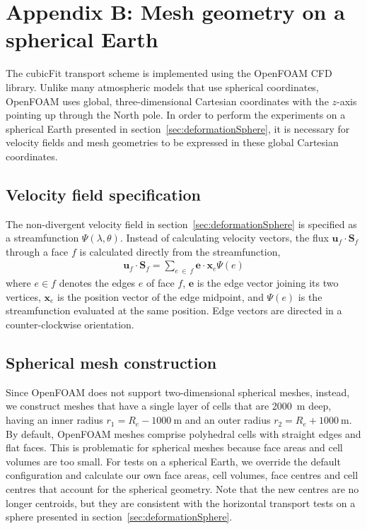 \section*{Appendix B: Mesh geometry on a spherical Earth}

The cubicFit transport scheme is implemented using the OpenFOAM CFD library.  Unlike many atmospheric models that use spherical coordinates, OpenFOAM uses global, three-dimensional Cartesian coordinates with the $z$-axis pointing up through the North pole.  In order to perform the experiments on a spherical Earth presented in section~\ref{sec:deformationSphere}, it is necessary for velocity fields and mesh geometries to be expressed in these global Cartesian coordinates.

\subsection*{Velocity field specification}
The non-divergent velocity field in section~\ref{sec:deformationSphere} is specified as a streamfunction $\Psi(\lambda, \theta)$.  Instead of calculating velocity vectors, the flux $\mathbf{u}_f \cdot \mathbf{S}_f$ through a face $f$ is calculated directly from the streamfunction,
\begin{align}
	\mathbf{u}_f \cdot \mathbf{S}_f	= \sum_{e\:\in\:f} \mathbf{e} \cdot \mathbf{x}_e \Psi(e) \label{eqn:nondiv-spherical-flux}
\end{align}
where $e \in f$ denotes the edges $e$ of face $f$, $\mathbf{e}$ is the edge vector joining its two vertices, $\mathbf{x}_e$ is the position vector of the edge midpoint, and $\Psi(e)$ is the streamfunction evaluated at the same position.
Edge vectors are directed in a counter-clockwise orientation.

\subsection*{Spherical mesh construction}

Since OpenFOAM does not support two-dimensional spherical meshes, instead, we construct meshes that have a single layer of cells that are \SI{2000}{\meter} deep, having an inner radius $r_1 = R_e - \SI{1000}{\meter}$ and an outer radius $r_2 = R_e + \SI{1000}{\meter}$.
By default, OpenFOAM meshes comprise polyhedral cells with straight edges and flat faces.  This is problematic for spherical meshes because face areas and cell volumes are too small.
For tests on a spherical Earth, we override the default configuration and calculate our own face areas, cell volumes, face centres and cell centres that account for the spherical geometry.  Note that the new centres are no longer centroids, but they are consistent with the horizontal transport tests on a sphere presented in section~\ref{sec:deformationSphere}.

